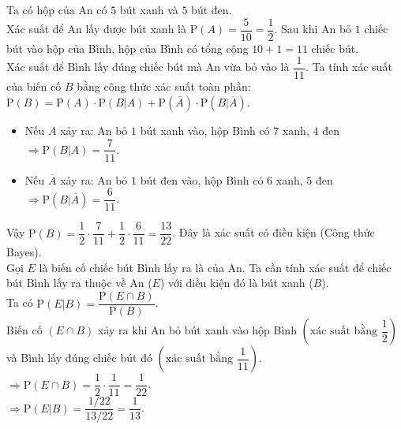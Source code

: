 \begin{ex}
{\begin{center}
\begin{tikzpicture}
			\end{tikzpicture}
		\end{center}
		\begin{itemchoice}
			\itemch Ta có hộp của An có $5$ bút xanh và $5$ bút đen.\\ Xác suất để An lấy được bút xanh là $\mathrm{P}(A) = \dfrac{5}{10} = \dfrac{1}{2}$.
			\itemch Sau khi An bỏ $1$ chiếc bút vào hộp của Bình, hộp của Bình có tổng cộng $10 + 1 = 11$ chiếc bút.\\ Xác suất để Bình lấy đúng chiếc bút mà An vừa bỏ vào là $\dfrac{1}{11}$.
			\itemch Ta tính xác suất của biến cố $B$ bằng công thức xác suất toàn phần:\\
			$\mathrm{P}(B) = \mathrm{P}(A) \cdot \mathrm{P}(B|A) + \mathrm{P}(\overline{A}) \cdot \mathrm{P}(B|\overline{A})$.
			\begin{itemize}
				\item Nếu $A$ xảy ra: An bỏ $1$ bút xanh vào, hộp Bình có $7$ xanh, $4$ đen $\Rightarrow \mathrm{P}(B|A) = \dfrac{7}{11}$.
				\item  Nếu $\overline{A}$ xảy ra: An bỏ $1$ bút đen vào, hộp Bình có $6$ xanh, $5$ đen $\Rightarrow \mathrm{P}(B|\overline{A}) = \dfrac{6}{11}$.
			\end{itemize}
			Vậy $\mathrm{P}(B) = \dfrac{1}{2} \cdot \dfrac{7}{11} + \dfrac{1}{2} \cdot \dfrac{6}{11} = \dfrac{13}{22}$.
			\itemch Đây là xác suất có điều kiện (Công thức Bayes).\\
			Gọi $E$ là biến cố chiếc bút Bình lấy ra là của An.
			 Ta cần tính xác suất để chiếc bút Bình lấy ra thuộc về An ($E$) với điều kiện đó là bút xanh ($B$).\\
			 Ta có 	$\mathrm{P}(E|B) = \dfrac{\mathrm{P}(E \cap B)}{\mathrm{P}(B)}$.\\
			Biến cố $(E \cap B)$ xảy ra khi An bỏ bút xanh vào hộp Bình $\left(\text{xác suất bằng}\,\,  \dfrac{1}{2}\right)$ và Bình lấy đúng chiếc bút đó $\left(\text{xác suất bằng}\,\, \dfrac{1}{11}\right)$.\\
			$\Rightarrow \mathrm{P}(E \cap B) = \dfrac{1}{2} \cdot \dfrac{1}{11} = \dfrac{1}{22}$.\\
			$\Rightarrow \mathrm{P}(E|B) = \dfrac{1/22}{13/22} = \dfrac{1}{13}$.
		\end{itemchoice}
	}
\end{ex}

